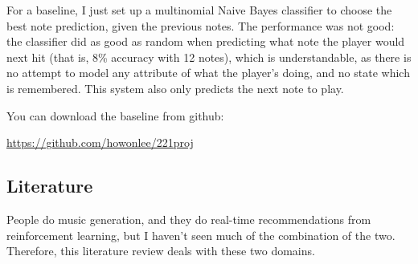 \documentclass{article}
\begin{document}
For a baseline, I just set up a multinomial Naive Bayes classifier to choose the best note prediction, given the previous notes. The performance was not good: the classifier did as good as random when predicting what note the player would next hit (that is, 8\% accuracy with 12 notes), which is understandable, as there is no attempt to model any attribute of what the player's doing, and no state which is remembered. This system also only predicts the next note to play.

You can download the baseline from github:

\url{https://github.com/howonlee/221proj}

\subsection*{Literature}
People do music generation, and they do real-time recommendations from reinforcement learning, but I haven't seen much of the combination of the two. Therefore, this literature review deals with these two domains.
\end{document}

